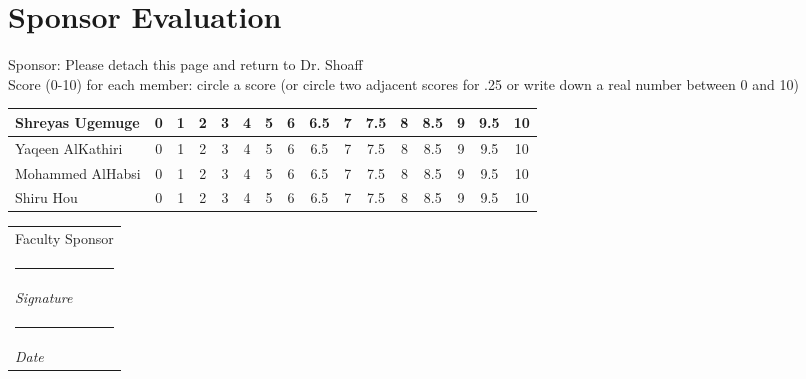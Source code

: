 \documentclass[12pt]{article}
\makeatletter
\newcommand{\namesigdate}[2][5cm]{%
  \begin{tabular}{@{}p{#1}@{}}
    #2 \\[2\normalbaselineskip] \hrule \\[0pt]
    {\small \textit{Signature}} \\ [2\normalbaselineskip] \hrule \\[0pt]
    {\small \textit{Date}}
  \end{tabular}
}
\makeatother
\begin{document}
	\pagebreak
	\section{Sponsor Evaluation}
	Sponsor: Please detach this page and return to Dr. Shoaff \\ \hfill \break 
	Score (0-10) for each member: circle a score (or circle two adjacent scores for .25 or write down a real number between 0 and 10) \\ \hfill \break
	\begin{tabularx}{\textwidth}{|X|c|c|c|c|c|c|c|c|c|c|c|c|c|c|c|}
	\hline
	Shreyas Ugemuge & 0 & 1 &  2 & 3 & 4 & 5 & 6 & 6.5 & 7 & 7.5 & 8 & 8.5 & 9 & 9.5 & 10 \\ \hline
	Yaqeen AlKathiri & 0 & 1 &  2 & 3 & 4 & 5 & 6 & 6.5 & 7 & 7.5 & 8 & 8.5 & 9 & 9.5 & 10 \\ \hline
	Mohammed AlHabsi & 0 & 1 &  2 & 3 & 4 & 5 & 6 & 6.5 & 7 & 7.5 & 8 & 8.5 & 9 & 9.5 & 10 \\ \hline
	Shiru Hou & 0 & 1 &  2 & 3 & 4 & 5 & 6 & 6.5 & 7 & 7.5 & 8 & 8.5 & 9 & 9.5 & 10 \\ 
	\hline 
	\end{tabularx}
	\hfil \break
	\hfil \break
	\namesigdate{Faculty Sponsor}
	
\end{document}
